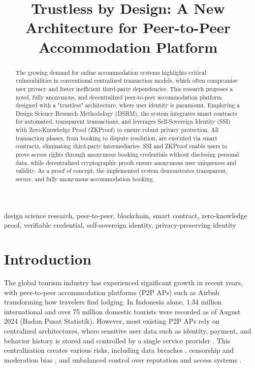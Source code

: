 \documentclass[conference]{IEEEtran}
\begin{document}
\title{Trustless by Design: A New Architecture for Peer-to-Peer Accommodation Platform}

\author{
}

\maketitle

\begin{abstract}
The growing demand for online accommodation systems highlights critical vulnerabilities in conventional centralized transaction models, which often compromise user privacy and foster inefficient third-party dependencies. This research proposes a novel, fully anonymous, and decentralized peer-to-peer accommodation platform designed with a "trustless" architecture, where user identity is paramount. Employing a Design Science Research Methodology (DSRM), the system integrates smart contracts for automated, transparent transactions, and leverages Self-Sovereign Identity (SSI) with Zero-Knowledge Proof (ZKProof) to ensure robust privacy protection. All transaction phases, from booking to dispute resolution, are executed via smart contracts, eliminating third-party intermediaries. SSI and ZKProof enable users to prove access rights through anonymous booking credentials without disclosing personal data, while decentralized cryptographic proofs ensure anonymous user uniqueness and validity. As a proof of concept, the implemented system demonstrates transparent, secure, and fully anonymous accommodation booking.
\end{abstract}

\begin{IEEEkeywords}
design science research, peer-to-peer, blockchain, smart contract, zero-knowledge proof, verifiable credential, self-sovereign identity, privacy-preserving identity
\end{IEEEkeywords}

\section{Introduction}
\label{sec:introduction}
The global tourism industry has experienced significant growth in recent years, with peer-to-peer accommodation platforms (P2P APs) such as Airbnb transforming how travelers find lodging. In Indonesia alone, 1.34 million international and over 75 million domestic tourists were recorded as of August 2024 (Badan Pusat Statistik). However, most existing P2P APs rely on centralized architectures, where sensitive user data such as identity, payment, and behavior history is stored and controlled by a single service provider \cite{rosoon2023, raj2019}. This centralization creates various risks, including data breaches \cite{rundle2024, malcolm2024}, censorship and moderation bias \cite{blengini2024}, and unbalanced control over reputation and access systems \cite{hawlitschek2018}.
\end{document}
